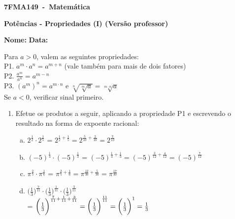 \documentclass[a4paper,14pt]{article}
\begin{document}
	
	\noindent\textbf{7FMA149~-~Matemática} 
	
	\begin{center}
		\textbf{Potências - Propriedades (I) (Versão professor)}
	\end{center}
	
	
	\noindent\textbf{Nome:} \underline{\hspace{10cm}}
    \noindent\textbf{Data:} \underline{\hspace{4cm}}
	
	
	\begin{multicols}{2}
		Para $a > 0$, valem as seguintes propriedades: \\
		P1. $a^m \cdot a^n = a^{m + n}$ (vale também para mais de dois fatores) \\
		P2. $\frac{a^m}{a^n} = a^{m - n}$ \\
		P3. $(a^m)^n = a^{m \cdot n}$ e $\sqrt[n]{\sqrt[m]{a}} = \sqrt[m \cdot n]{a}$ \\
		Se $a < 0$, verificar sinal primeiro.
	\begin{enumerate}
        \item Efetue os produtos a seguir, aplicando a propriedade P1 e escrevendo o resultado na forma de expoente racional:
        \begin{enumerate}[a)]
        	\item $2^\frac{1}{2} \cdot 2^\frac{1}{5}$ = $2^{\frac{1}{2} + \frac{1}{5}} = 2^{\frac{5}{10}+\frac{2}{10}} = 2^\frac{7}{10}$\\
        	\item $(-5)^\frac{1}{4} \cdot (-5)^\frac{1}{3}$ = $(-5)^{\frac{1}{4} + \frac{1}{3}} = (-5)^{\frac{3}{12} + \frac{4}{12}} = (-5)^\frac{7}{12}$ \\
        	\item $\pi^\frac{2}{5} \cdot \pi^\frac{1}{6}$ = $\pi^{\frac{2}{5} + \frac{1}{6}} = \pi^{\frac{12}{30} + \frac{5}{30}} = \pi^{\frac{17}{30}}$\\
        	\item $\bigg(\frac{1}{3}\bigg)^{\frac{7}{11}} \cdot \bigg(\frac{1}{3}\bigg)^{\frac{1}{11}} \cdot  \bigg(\frac{1}{3}\bigg)^{\frac{3}{11}}$ \\= $\bigg(\frac{1}{3}\bigg)^{\frac{7}{11} + \frac{1}{11} + \frac{3}{11}} = \bigg(\frac{1}{3}\bigg)^\frac{11}{11} \\= \bigg(\frac{1}{3}\bigg)^1 = \frac{1}{3}$\\

\end{enumerate}
\end{enumerate}
\end{multicols}
\end{document}

